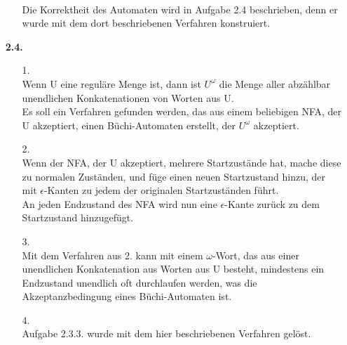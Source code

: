 \documentclass[a4paper,11pt,fleqn]{scrartcl}
\begin{document}
\begin{enumerate}
\begin{enumerate}
 \\
	Die Korrektheit des Automaten wird in Aufgabe 2.4 beschrieben, denn er wurde mit dem dort beschriebenen Verfahren konstruiert.
        \end{enumerate}
    \item[\textbf{2.4.}]
	    \begin{enumerate}
    	\item[1.]\quad \\
        	Wenn U eine reguläre Menge ist, dann ist $U^\omega$ die Menge aller abzählbar unendlichen Konkatenationen von Worten aus U. \\
        	Es soll ein Verfahren gefunden werden, das aus einem beliebigen NFA, der U akzeptiert, einen Büchi-Automaten erstellt, der $U^\omega$ akzeptiert.
        \newpage
    	\item[2.]\quad \\
        	Wenn der NFA, der U akzeptiert, mehrere Startzustände hat, mache diese zu normalen Zuständen, und füge einen neuen Startzustand hinzu, der mit $\epsilon$-Kanten zu jedem der originalen Startzuständen führt. \\
        	An jeden Endzustand des NFA wird nun eine $\epsilon$-Kante zurück zu dem Startzustand hinzugefügt.
    	\item[3.]\quad \\
        	Mit dem Verfahren aus 2. kann mit einem $\omega$-Wort, das aus einer unendlichen Konkatenation aus Worten aus U besteht, mindestens ein Endzustand unendlich oft durchlaufen werden, was die Akzeptanzbedingung eines Büchi-Automaten ist.
    	\item[4.]\quad \\
        	Aufgabe 2.3.3. wurde mit dem hier beschriebenen Verfahren gelöst.
   		\end{enumerate}
    \end{enumerate}
\end{document}
